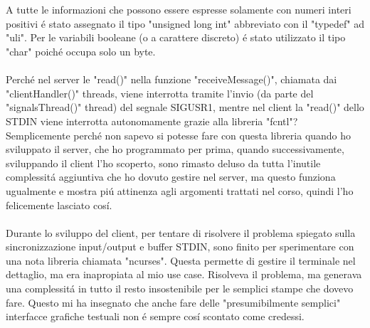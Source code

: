  \\
 \\
 A tutte le informazioni che possono essere espresse solamente con numeri interi positivi \'e stato assegnato il tipo "unsigned long int" abbreviato con il "typedef" ad "uli". Per le variabili booleane (o a carattere discreto) \'e stato utilizzato il tipo "char" poich\'e occupa solo un byte.
 \\
 \\
 Perch\'e nel server le "read()" nella funzione "receiveMessage()", chiamata dai "clientHandler()" threads, viene interrotta tramite l'invio (da parte del "signalsThread()" thread) del segnale SIGUSR1, mentre nel client la "read()" dello STDIN viene interrotta autonomamente grazie alla libreria "fcntl"? Semplicemente perch\'e non sapevo si potesse fare con questa libreria quando ho sviluppato il server, che ho programmato per prima, quando successivamente, sviluppando il client l'ho scoperto, sono rimasto deluso da tutta l'inutile complessit\'a aggiuntiva che ho dovuto gestire nel server, ma questo funziona ugualmente e mostra pi\'u attinenza agli argomenti trattati nel corso, quindi l'ho felicemente lasciato cos\'i.
 \\
 \\
 Durante lo sviluppo del client, per tentare di risolvere il problema spiegato sulla sincronizzazione input/output e buffer STDIN, sono finito per sperimentare con una nota libreria chiamata "ncurses". Questa permette di gestire il terminale nel dettaglio, ma era inapropiata al mio use case. Risolveva il problema, ma generava una complessit\'a in tutto il resto insostenibile per le semplici stampe che dovevo fare. Questo mi ha insegnato che anche fare delle "presumibilmente semplici" interfacce grafiche testuali non \'e sempre cos\'i scontato come credessi.

\iffalse
\begin{figure}[H]
    \centering
    \texttt{[image: immagine.png]}
    \caption{Descrizione.}
\end{figure}
\fi

